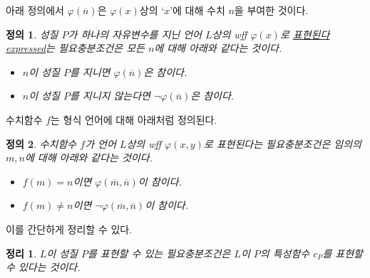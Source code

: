 \documentclass[a4paper,chapter,atbegshi]{oblivoir}
\newtheorem{defn}{정의}[chapter]
\newtheorem{theo}{정리}[chapter]
\begin{document}
아래 정의에서 $\varphi(\overline{n})$은 $\varphi(x)$상의
`$x$'에 대해 수치 $n$을 부여한 것이다.
\begin{defn}\label{defn:112}
  성질 $P$가 하나의 자유변수를 지닌 언어 $L$상의 wff $\varphi(x)$로
  \underline{표현된다{\tiny expressed}}는 필요충분조건은 모든 $n$에 대해 아래와
  같다는 것이다.
  \begin{itemize}
    \item $n$이 성질 $P$를 지니면 $\varphi(\overline{n})$은 참이다.
    \item $n$이 성질 $P$를 지니지 않는다면 $\neg\varphi(\overline{n})$은 참이다.
  \end{itemize}
\end{defn}
수치함수 $f$는 형식 언어에 대해 아래처럼 정의된다.
\begin{defn}\label{defn:113}
  수치함수 $f$가 언어 $L$상의 wff $\varphi(x,y)$로 표현된다는 필요충분조건은
  임의의 $m,n$에 대해 아래와 같다는 것이다.
  \begin{itemize}
    \item $f(m)=n$이면 $\varphi(\overline{m},\overline{n})$이 참이다.
    \item $f(m)\neq n$이면 $\neg\varphi(\overline{m},\overline{n})$이 참이다.
  \end{itemize}
\end{defn}
이를 간단하게 정리할 수 있다.
\begin{theo}\label{theo:114}
  $L$이 성질 $P$를 표현할 수 있는 필요충분조건은
  $L$이 $P$의 특성함수 $c_P$를 표현할 수 있다는 것이다.
\end{theo}
\end{document}
